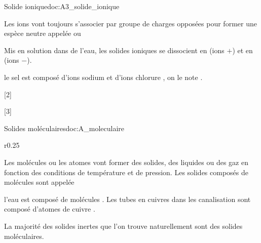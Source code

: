\begin{doc}{Solide ionique}{doc:A3_solide_ionique}
  \begin{importants}
    Les ions vont toujours s'associer par groupe de charges opposées pour former une espèce neutre appelée  ou 
  \end{importants}
  
  Mis en solution dans de l'eau, les solides ioniques se dissocient en  (ions $+$) et en  (ions $-$).
  
  \exemple le sel est composé d'ions sodium  et d'ions chlorure \chlorure, on le note .
\end{doc}

\pasCorrection{\newpage \vspace*{-30pt}}
[2]

[3]



\begin{doc}{Solides moléculaires}{doc:A_moleculaire}
  \vspace*{-16pt}
  \begin{wrapfigure}{r}{0.25\linewidth}
    \vspace*{-22pt}
    \centering
  \end{wrapfigure}
  \phantom{bla}
  
  \begin{importants}
    Les molécules ou les atomes vont former des solides, des liquides ou des gaz en fonction des conditions de température et de pression.
    Les solides composés de molécules sont appelée 
  \end{importants}
  \exemple l'eau est composé de molécules .
  Les tubes en cuivres dans les canalisation sont composé d'atomes de cuivre .

  La majorité des solides inertes que l'on trouve naturellement sont des solides moléculaires.
\end{doc}

